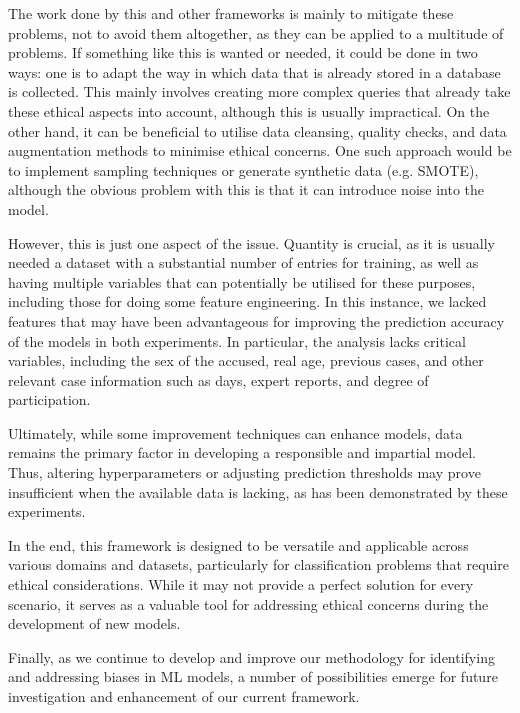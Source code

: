 \documentclass[twoside,11pt]{article}
\begin{document}
The work done by this and other frameworks is mainly to mitigate these problems, not to avoid them altogether, as they can be applied to a multitude of problems. If something like this is wanted or needed, it could be done in two ways: one is to adapt the way in which data that is already stored in a database is collected. This mainly involves creating more complex queries that already take these ethical aspects into account, although this is usually impractical. On the other hand, it can be beneficial to utilise data cleansing, quality checks, and data augmentation methods to minimise ethical concerns. One such approach would be to implement sampling techniques or generate synthetic data (e.g. SMOTE), although the obvious problem with this is that it can introduce noise into the model.

However, this is just one aspect of the issue. Quantity is crucial, as it is usually needed a dataset with a substantial number of entries for training, as well as having multiple variables that can potentially be utilised for these purposes, including those for doing some feature engineering. In this instance, we lacked features that may have been advantageous for improving the prediction accuracy of the models in both experiments. In particular, the analysis lacks critical variables, including the sex of the accused, real age, previous cases, and other relevant case information such as days, expert reports, and degree of participation.

Ultimately, while some improvement techniques can enhance models, data remains the primary factor in developing a responsible and impartial model. Thus, altering hyperparameters or adjusting prediction thresholds may prove insufficient when the available data is lacking, as has been demonstrated by these experiments.

In the end, this framework is designed to be versatile and applicable across various domains and datasets, particularly for classification problems that require ethical considerations. While it may not provide a perfect solution for every scenario, it serves as a valuable tool for addressing ethical concerns during the development of new models.

Finally, as we continue to develop and improve our methodology for identifying and addressing biases in ML models, a number of possibilities emerge for future investigation and enhancement of our current framework.
\end{document}
